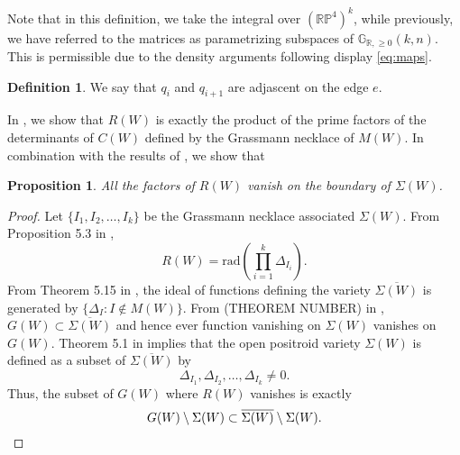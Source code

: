 \documentclass[11pt]{article}
\newcommand{\R}{\mathbb{R}}
\newcommand{\RP}{\mathbb{R}\mathbb{P}}
\newcommand{\Gr}{\mathbb{G}_{\R, \geq 0}}
\newtheorem{prop}[thm]{Proposition}
\theoremstyle{remark}
\theoremstyle{definition}
\newtheorem{dfn}[thm]{Definition}
\begin{document}
Note that in this definition, we take the integral over $(\RP^4)^k$, while previously, we have referred to the matrices as parametrizing subspaces of $\Gr(k,n)$. This is permissible due to the density arguments following display \eqref{eq:maps}.

\begin{dfn}
We say that $q_i$ and $q_{i+1}$ are adjascent on the edge $e$.
\end{dfn}

In \cite{generalcombinatoricsII}, we show that $R(W)$ is exactly the product of the prime factors of the determinants of $C(W)$ defined by the Grassmann necklace of $M(W)$. In combination with the results of \cite{basisshapeloci}, we show that 

\begin{prop}
All the factors of $R(W)$ vanish on the boundary of $\Sigma(W)$.
\end{prop}


\begin{proof}
Let $\{I_1, I_2, \dots, I_k\}$ be the Grassmann necklace associated $\Sigma(W)$. From Proposition 5.3 in \cite{generalcombinatoricsII},
%
\begin{displaymath}
R(W) = \mathrm{rad}\left(\prod_{i = 1}^{k} \Delta_{I_i}\right).
\end{displaymath}
%
From Theorem 5.15 in \cite{knutsonlamspeyerjuggling}, the ideal of functions defining the variety $\overline{\Sigma(W)}$ is generated by $\{\Delta_I : I \notin M(W)\}$. From (THEOREM NUMBER) in \cite{basisshapeloci}, $G(W) \subset \overline{\Sigma(W)}$ and hence ever function vanishing on $\Sigma(W)$ vanishes on $G(W)$. Theorem 5.1 in \cite{knutsonlamspeyerjuggling} implies that the open positroid variety $\Sigma(W)$ is defined as a subset of $\overline{\Sigma(W)}$ by
%
\begin{displaymath}
\Delta_{I_1}, \Delta_{I_2}, \dots, \Delta_{I_k} \neq 0.
\end{displaymath}
%
Thus, the subset of $G(W)$ where $R(W)$ vanishes is exactly
%
\begin{displaymath}
G(W) \setminus \Sigma(W) \subset \overline{\Sigma(W)} \setminus \Sigma(W). \qedhere
\end{displaymath}
\end{proof}
\end{document}
